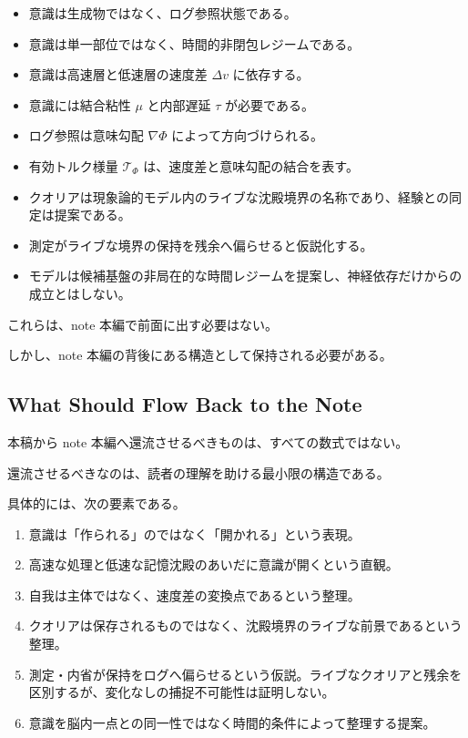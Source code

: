 \begin{itemize}
\item 意識は生成物ではなく、ログ参照状態である。
\item 意識は単一部位ではなく、時間的非閉包レジームである。
\item 意識は高速層と低速層の速度差 $\Delta v$ に依存する。
\item 意識には結合粘性 $\mu$ と内部遅延 $\tau$ が必要である。
\item ログ参照は意味勾配 $\nabla \Phi$ によって方向づけられる。
\item 有効トルク様量 $\mathcal{T}_{\Phi}$ は、速度差と意味勾配の結合を表す。
\item クオリアは現象論的モデル内のライブな沈殿境界の名称であり、経験との同定は提案である。
\item 測定がライブな境界の保持を残余へ偏らせると仮説化する。
\item モデルは候補基盤の非局在的な時間レジームを提案し、神経依存だけからの成立とはしない。
\end{itemize}

これらは、note 本編で前面に出す必要はない。

しかし、note 本編の背後にある構造として保持される必要がある。

\subsection{What Should Flow Back to the Note}

本稿から note 本編へ還流させるべきものは、すべての数式ではない。

還流させるべきなのは、読者の理解を助ける最小限の構造である。

具体的には、次の要素である。

\begin{enumerate}
\item 意識は「作られる」のではなく「開かれる」という表現。
\item 高速な処理と低速な記憶沈殿のあいだに意識が開くという直観。
\item 自我は主体ではなく、速度差の変換点であるという整理。
\item クオリアは保存されるものではなく、沈殿境界のライブな前景であるという整理。
\item 測定・内省が保持をログへ偏らせるという仮説。ライブなクオリアと残余を区別するが、変化なしの捕捉不可能性は証明しない。
\item 意識を脳内一点との同一性ではなく時間的条件によって整理する提案。
\end{enumerate}

